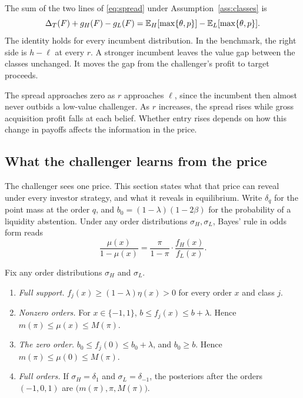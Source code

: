 The sum of the two lines of \eqref{eq:spread} under Assumption~\ref{ass:classes} is
\[
\Delta_T(F)+g_H(F)-g_L(F)=\mathbb{E}_H[\max\{\theta,p\}]-\mathbb{E}_L[\max\{\theta,p\}].
\]
The identity holds for every incumbent distribution. In the benchmark, the right side is \(h-\ell\) at every
\(r\). A stronger incumbent leaves the value gap between the classes unchanged. It moves the gap from the
challenger's profit to target proceeds.

The spread approaches zero as \(r\) approaches \(\ell\), since the incumbent then almost never outbids a
low-value challenger. As \(r\) increases, the spread rises while gross acquisition profit falls at each belief.
Whether entry rises depends on how this change in payoffs affects the information in the price.

\subsection{What the challenger learns from the price}\label{sec:inference}

The challenger sees one price. This section states what that price can reveal under every investor strategy, and
what it reveals in equilibrium. Write \(\delta_q\) for the point mass at the order \(q\), and
\(b_0=(1-\lambda)(1-2\beta)\) for the probability of a liquidity abstention. Under any order distributions
\(\sigma_H,\sigma_L\), Bayes' rule in odds form reads
\begin{equation}\label{eq:odds}
\frac{\mu(x)}{1-\mu(x)}=\frac{\pi}{1-\pi}\cdot\frac{f_H(x)}{f_L(x)}.
\end{equation}

\begin{lemma}\label{lem:beliefs}
Fix any order distributions \(\sigma_H\) and \(\sigma_L\).
\begin{enumerate}[label=(\alph*),leftmargin=2em]
\item \emph{Full support.} \(f_j(x)\ge(1-\lambda)\eta(x)>0\) for every order \(x\) and class \(j\).
\item \emph{Nonzero orders.} For \(x\in\{-1,1\}\), \(b\le f_j(x)\le b+\lambda\). Hence
\(m(\pi)\le\mu(x)\le M(\pi)\).
\item \emph{The zero order.} \(b_0\le f_j(0)\le b_0+\lambda\), and \(b_0\ge b\). Hence
\(m(\pi)\le\mu(0)\le M(\pi)\).
\item \emph{Full orders.} If \(\sigma_H=\delta_1\) and \(\sigma_L=\delta_{-1}\), the posteriors after the orders
\((-1,0,1)\) are \(\bigl(m(\pi),\pi,M(\pi)\bigr)\).
\end{enumerate}
\end{lemma}

